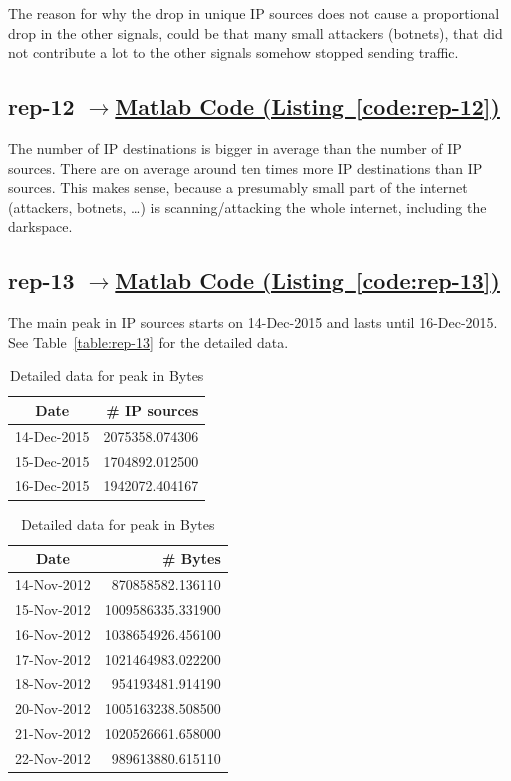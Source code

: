 \documentclass{article}
\newcommand{\codelink}[1]{%
    \hyperref[#1]{\quad$\rightarrow$\enskip Matlab Code (Listing~\ref{#1})}%
}
\begin{document}
The reason for why the drop in unique IP sources does not cause a proportional drop in the other
signals, could be that many small attackers (botnets), that did not contribute a lot to the other
signals somehow stopped sending traffic.

\subsection{rep-12 \codelink{code:rep-12}}

The number of IP destinations is bigger in average than the number of IP sources.
There are on average around ten times more IP destinations than IP sources.
This makes sense, because a presumably small part of the internet (attackers, botnets, \ldots)
is scanning/attacking the whole internet, including the darkspace.

\subsection{rep-13 \codelink{code:rep-13}}

The main peak in IP sources starts on 14-Dec-2015 and lasts until 16-Dec-2015. See Table~\ref{table:rep-13}
for the detailed data.

\begin{table}[H]
    \parbox{.5\linewidth}{
        \centering
        \begin{tabular}{c|r}
            Date & \# IP sources \\
            \hline
            14-Dec-2015 & 2075358.074306 \\
            15-Dec-2015 & 1704892.012500 \\
            16-Dec-2015 & 1942072.404167 \\
        \end{tabular}
        \caption{\label{table:rep-13} Detailed data for peak in IP sources}
    }
    \parbox{.5\linewidth}{
        \centering
        \begin{tabular}{c|r}
            Date & \# Bytes \\
            \hline
            14-Nov-2012& 870858582.136110 \\ 
            15-Nov-2012& 1009586335.331900 \\
            16-Nov-2012& 1038654926.456100 \\
            17-Nov-2012& 1021464983.022200 \\
            18-Nov-2012& 954193481.914190 \\ 
            20-Nov-2012& 1005163238.508500 \\
            21-Nov-2012& 1020526661.658000 \\
            22-Nov-2012& 989613880.615110  \\
        \end{tabular}
        \caption{\label{table:rep-13-optional} Detailed data for peak in Bytes}
    }
\end{table}
\end{document}

